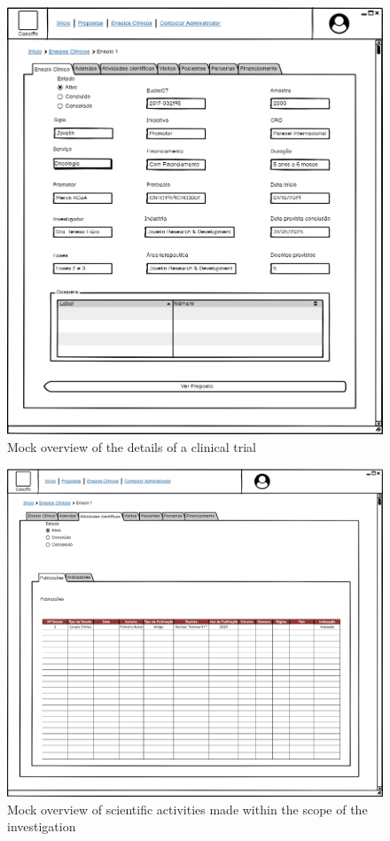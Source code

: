 \begin{figure}
    \centering
    \includegraphics{images/ensaio-detalhe.png}
    \caption{Mock overview of the details of a clinical trial}
    \label{fig:enasio-detalhe}
\end{figure}


\begin{figure}
    \centering
    \includegraphics{images/ensaio-atividades-cientificas.png}
    \caption{Mock overview of scientific activities made within the scope of the investigation}
    \label{fig:ensaio-atividades-cientificas}
\end{figure}


